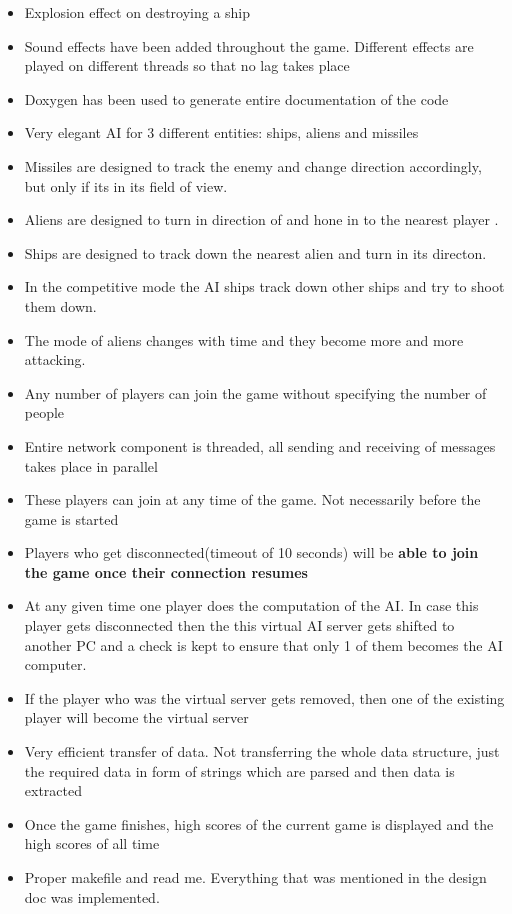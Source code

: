 \documentclass[12pt]{article}
\begin{document}
\begin{itemize}
	\item Explosion effect on destroying a ship
	\item Sound effects have been added throughout the game. Different effects are played on different threads so that no lag takes place
	\item Doxygen has been used to generate entire documentation of the code
	\item Very elegant AI for 3 different entities: ships, aliens and missiles
	\item Missiles are designed to track the enemy and change direction accordingly, but only if its in its field of view.
	\item Aliens are designed to turn in direction of and hone in to the nearest player .
	\item Ships are designed to track down the nearest alien and turn in its directon.
	\item In the competitive mode the AI ships track down other ships and try to shoot them down.
	\item The mode of aliens changes with time and they become more and more attacking.
	\item Any number of players can join the game without specifying the number of people
	\item Entire network component is threaded, all sending and receiving of messages takes place in parallel
	\item These players can join at any time of the game. Not necessarily before the game is started
	\item Players who get disconnected(timeout of 10 seconds) will be \textbf{able to join the game once their connection resumes}
	\item At any given time one player does the computation of the AI. In case this player gets disconnected then the this virtual AI server gets shifted to another PC and a check is kept to ensure that only 1 of them becomes the AI computer.  
	\item If the player who was the virtual server gets removed, then one of the existing player will become the virtual server
	\item Very efficient transfer of data. Not transferring the whole data structure, just the required data in form of strings which are parsed and then data is extracted
	\item Once the game finishes, high scores of the current game is displayed and the high scores of all time
	\item Proper makefile and read me. Everything that was mentioned in the design doc was implemented.
\end{itemize}
\end{document}
